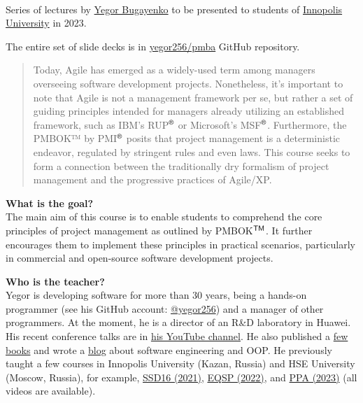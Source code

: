 \documentclass[nobrand,anonymous,nodate,nosecurity]{huawei}
\newcommand\REG{$^{\tiny{\textsf{\textregistered}}}$}
\newcommand\TM{$^{\tiny{\textsf{TM}}}$}
\begin{document}
{\\
Series of lectures by \href{https://www.yegor256.com}{Yegor Bugayenko} to be presented
to students of \href{https://innopolis.university/en/}{Innopolis University} in 2023.

The entire set of slide decks is in \href{https://github.com/yegor256/pmba}{yegor256/pmba} GitHub repository.

\begin{abstract}
Today, Agile has emerged as a widely-used term among managers overseeing software development projects. Nonetheless, it's important to note that Agile is not a management framework per se, but rather a set of guiding principles intended for managers already utilizing an established framework, such as IBM's RUP\REG{} or Microsoft's MSF\REG{}. Furthermore, the PMBOK™ by PMI\REG{} posits that project management is a deterministic endeavor, regulated by stringent rules and even laws. This course seeks to form a connection between the traditionally dry formalism of project management and the progressive practices of Agile/XP.
\end{abstract}


\textbf{What is the goal?}\\
The main aim of this course is to enable students to comprehend the core principles of project management as outlined by PMBOK\TM{}. It further encourages them to implement these principles in practical scenarios, particularly in commercial and open-source software development projects.

\textbf{Who is the teacher?}\\
Yegor is developing software for more than 30 years, being a hands-on programmer
(see his GitHub account: \href{https://github.com/yegor256}{@yegor256})
and a manager of other programmers. At the moment, he is a director
of an R\&D laboratory in Huawei. His recent conference talks are in
\href{https://www.youtube.com/channel/UCr9qCdqXLm2SU0BIs6d_68Q}{his YouTube channel}.
He also published a \href{https://www.yegor256.com/books.html}{few books}
and wrote a \href{https://www.yegor256.com/contents.html}{blog} about software engineering
and OOP.
He previously taught a few courses in
Innopolis University (Kazan, Russia)
and HSE University (Moscow, Russia),
for example,
\href{https://github.com/yegor256/ssd16}{SSD16 (2021)},
\href{https://github.com/yegor256/eqsp}{EQSP (2022)},
and
\href{https://github.com/yegor256/ppa}{PPA (2023)}
(all videos are available).

}
\end{document}
